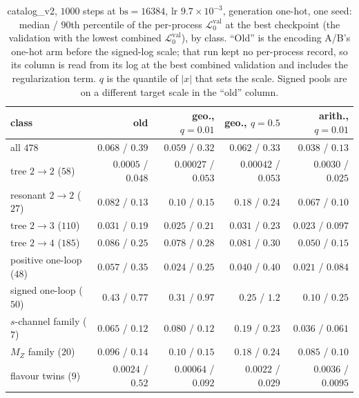 \documentclass[11pt]{article}
\newcommand{\vlnr}{\mathcal{L}^{\mathrm{val}}_{0}}   %
\begin{document}
\begin{table}[H]
\centering
\caption{catalog\_v2, $1000$ steps at $\mathrm{bs}=16384$, lr $9.7\times10^{-3}$, generation
one-hot, one seed: median / $90$th percentile of the per-process $\vlnr$ at the best checkpoint
(the validation with the lowest combined $\vlnr$), by class. ``Old'' is the encoding A/B's one-hot
arm before the signed-log scale; that run kept no per-process record, so its column is read from
its log at the best combined validation and includes the regularization term. $q$ is the quantile
of $|x|$ that sets the scale. Signed pools are on a different target scale in the ``old'' column.}
\label{tab:catv2_short}
\small
\begin{tabular}{@{}lrrrr@{}}
\toprule
class & old & geo., $q=0.01$ & geo., $q=0.5$ & arith., $q=0.01$ \\
\midrule
all $478$ & $0.068$ / $0.39$ & $0.059$ / $0.32$ & $0.062$ / $0.33$ & $0.038$ / $0.13$ \\
tree $2\to2$ ($58$) & $0.0005$ / $0.048$ & $0.00027$ / $0.053$ & $0.00042$ / $0.053$ & $0.0030$ / $0.025$ \\
resonant $2\to2$ ($27$) & $0.082$ / $0.13$ & $0.10$ / $0.15$ & $0.18$ / $0.24$ & $0.067$ / $0.10$ \\
tree $2\to3$ ($110$) & $0.031$ / $0.19$ & $0.025$ / $0.21$ & $0.031$ / $0.23$ & $0.023$ / $0.097$ \\
tree $2\to4$ ($185$) & $0.086$ / $0.25$ & $0.078$ / $0.28$ & $0.081$ / $0.30$ & $0.050$ / $0.15$ \\
positive one-loop ($48$) & $0.057$ / $0.35$ & $0.024$ / $0.25$ & $0.040$ / $0.40$ & $0.021$ / $0.084$ \\
signed one-loop ($50$) & $0.43$ / $0.77$ & $0.31$ / $0.97$ & $0.25$ / $1.2$ & $0.10$ / $0.25$ \\
$s$-channel family ($7$) & $0.065$ / $0.12$ & $0.080$ / $0.12$ & $0.19$ / $0.23$ & $0.036$ / $0.061$ \\
$M_Z$ family ($20$) & $0.096$ / $0.14$ & $0.10$ / $0.15$ & $0.18$ / $0.24$ & $0.085$ / $0.10$ \\
flavour twins ($9$) & $0.0024$ / $0.52$ & $0.00064$ / $0.092$ & $0.0022$ / $0.029$ & $0.0036$ / $0.0095$ \\
\bottomrule
\end{tabular}
\end{table}
\end{document}
